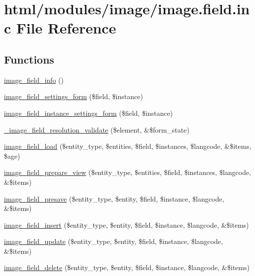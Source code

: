 \hypertarget{image_8field_8inc}{
\section{html/modules/image/image.field.inc File Reference}
\label{image_8field_8inc}
}
\subsection*{Functions}
\begin{DoxyCompactItemize}
\item 
\hyperlink{image_8field_8inc_a28bbfd28b358636c68969c9f1d635f98}{image\_\-field\_\-info} ()
\item 
\hyperlink{image_8field_8inc_a8ddb2762346a881f257c44aab5bda13e}{image\_\-field\_\-settings\_\-form} (\$field, \$instance)
\item 
\hyperlink{image_8field_8inc_a0fb703ddacaa5e38cdc62b33786aecac}{image\_\-field\_\-instance\_\-settings\_\-form} (\$field, \$instance)
\item 
\hyperlink{image_8field_8inc_af4577f26176adb7633adb3b2dd8749c2}{\_\-image\_\-field\_\-resolution\_\-validate} (\$element, \&\$form\_\-state)
\item 
\hyperlink{image_8field_8inc_a863cf5e04ef81f3b8e4dfece71766af1}{image\_\-field\_\-load} (\$entity\_\-type, \$entities, \$field, \$instances, \$langcode, \&\$items, \$age)
\item 
\hyperlink{image_8field_8inc_a5d3586894f3a316c3d7c88455d0cd30b}{image\_\-field\_\-prepare\_\-view} (\$entity\_\-type, \$entities, \$field, \$instances, \$langcode, \&\$items)
\item 
\hyperlink{image_8field_8inc_a6bbe53bf7c5f4bd0a98bc61557ef861b}{image\_\-field\_\-presave} (\$entity\_\-type, \$entity, \$field, \$instance, \$langcode, \&\$items)
\item 
\hyperlink{image_8field_8inc_ae627251982fda4938b22119e9760a7b4}{image\_\-field\_\-insert} (\$entity\_\-type, \$entity, \$field, \$instance, \$langcode, \&\$items)
\item 
\hyperlink{image_8field_8inc_ab293134daf1be482d495dba9b93e2335}{image\_\-field\_\-update} (\$entity\_\-type, \$entity, \$field, \$instance, \$langcode, \&\$items)
\item 
\hyperlink{image_8field_8inc_ac1fc99b6479859cd10477476064285f2}{image\_\-field\_\-delete} (\$entity\_\-type, \$entity, \$field, \$instance, \$langcode, \&\$items)
\item 

\end{DoxyCompactItemize}
